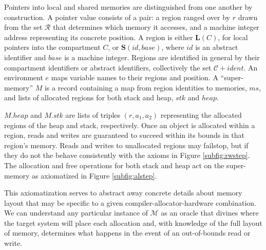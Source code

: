 \documentclass{article}
\begin{document}
Pointers into local and shared memories are distinguished from one another by construction.
A pointer value consists of a pair: a region ranged over by \(r\) drawn from the set
\(\mathcal{R}\) that determines which memory it accesses, and a machine integer address representing
its concrete position. A region is either \(\mathbf{L}(C)\), for local pointers into
the compartment \(C\), or \(\mathbf{S}(id,\mathit{base})\), where \(id\) is an
abstract identifier and \(\mathit{base}\) is a machine integer. Regions are identified
in general by their compartment identifiers or abstract identifiers, collectively
the set \(\mathcal{C} + \mathit{ident}\). An environment \(e\) maps variable names to
their regions and position. A ``super-memory'' \(M\)
is a record containing a map from region identities to memories, \(ms\),
and lists of allocated regions for both stack and heap, \(stk\) and \(heap\).

\(M.heap\) and \(M.stk\) are lists of triples \((r, a_1, a_2)\) representing
the allocated regions of the heap and stack, respectively.
Once an object is allocated within a region, reads and writes are guaranteed to succeed
within its bounds in that region's memory. Reads and writes to unallocated regions may
failstop, but if they do not the behave consistently with the axioms in Figure \ref{subfig:rwstep}.
The allocation and free operations for both stack and heap act on the super-memory
as axiomatized in Figure \ref{subfig:alstep}.

This axiomatization serves to abstract away concrete details about memory layout
that may be specific to a given compiler-allocator-hardware combination. We can
understand any particular instance of \(\mathcal{M}\) as an oracle that divines where
the target system will place each allocation and, with knowledge of the full layout of
memory, determines what happens in the event of an out-of-bounds read or write.
\end{document}
